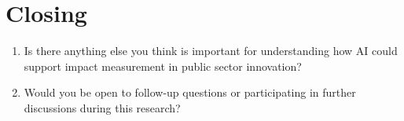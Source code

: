 \vspace{1em}

\section*{Closing}

\begin{enumerate}
    \item Is there anything else you think is important for understanding how AI could support impact measurement in public sector innovation?
    \item Would you be open to follow-up questions or participating in further discussions during this research?
\end{enumerate}

